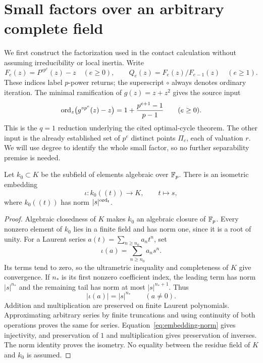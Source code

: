 \section{Small factors over an arbitrary complete field}
\label{sec:coefficients}

We first construct the factorization used in the contact calculation
without assuming irreducibility or local inertia. Write
\begin{equation}\label{eq:returns}
 F_e(z)=P^{\circ p^e}(z)-z\quad(e\ge0),\qquad
 Q_e(z)=F_e(z)/F_{e-1}(z)\quad(e\ge1).
\end{equation}
These indices label $p$-power returns; the superscript $\circ$ always
denotes ordinary iteration. The minimal ramification of $g(z)=z+z^2$
gives the source input
\begin{equation}\label{eq:minimal-ramification}
 \operatorname{ord}_z\bigl(g^{\circ p^e}(z)-z\bigr)
 =1+\frac{p^{e+1}-1}{p-1}\qquad(e\ge0).
\end{equation}
This is the $q=1$ reduction underlying the cited optimal-cycle theorem.
The other input is the already established set of $p^e$ distinct
points $\Pi_e$, each of valuation $r$. We will use degree to identify
the whole small factor, so no further separability premise is needed.

\begin{lemma}\label{lem:coefficient-field}
Let $k_0\subset K$ be the subfield of elements algebraic over $\mathbb F_p$.
There is an isometric embedding
\[
 \iota:k_0((t))\longrightarrow K,\qquad t\longmapsto s,
\]
where $k_0((t))$ has norm $|s|^{\operatorname{ord}_t}$.
\end{lemma}
\begin{proof}
Algebraic closedness of $K$ makes $k_0$ an algebraic closure of
$\mathbb F_p$. Every nonzero element of $k_0$ lies in a finite field and
has norm one, since it is a root of unity. For a Laurent series
$a(t)=\sum_{n\ge n_0}a_nt^n$, set
\[
 \iota(a)=\sum_{n\ge n_0}a_ns^n.
\]
Its terms tend to zero, so the ultrametric inequality and completeness
of $K$ give convergence. If $n_*$ is its first nonzero coefficient
index, the leading term has norm $|s|^{n_*}$ and the remaining tail
has norm at most $|s|^{n_*+1}$. Thus
\begin{equation}\label{eq:embedding-norm}
 |\iota(a)|=|s|^{n_*}\qquad(a\ne0).
\end{equation}
Addition and multiplication are preserved on finite Laurent
polynomials. Approximating arbitrary series by finite truncations
and using continuity of both operations proves the same for series.
Equation~\eqref{eq:embedding-norm} gives injectivity, and preservation
of $1$ and multiplication gives preservation of inverses. The norm
identity proves the isometry. No equality between the residue field
of $K$ and $k_0$ is assumed.
\end{proof}

